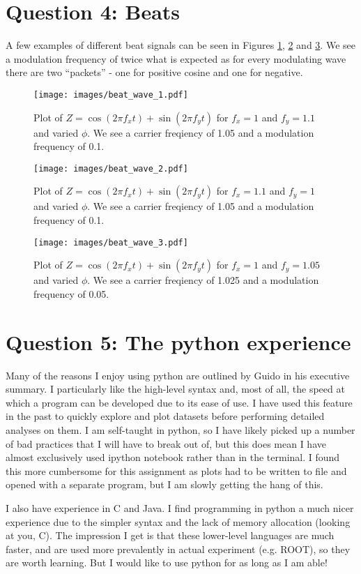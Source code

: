 \documentclass{article}
\begin{document}
\clearpage

\section*{Question 4: Beats}

A few examples of different beat signals can be seen in Figures \ref{fig:beat1}, \ref{fig:beat2} and \ref{fig:beat3}. We see a modulation frequency of twice what is expected as for every modulating wave there are two ``packets'' - one for positive cosine and one for negative.

\begin{figure}[h]
\centering
\texttt{[image: images/beat\_wave\_1.pdf]}
\caption{Plot of $Z = \cos(2\pi f_x t) + \sin(2\pi f_y t)$ for $f_x= 1$ and $f_y= 1.1$ and varied $\phi$. We see a carrier freqiency of 1.05 and a modulation frequency of 0.1.}
\label{fig:beat1}
\end{figure}

\begin{figure}[h]
\centering
\texttt{[image: images/beat\_wave\_2.pdf]}
\caption{Plot of $Z = \cos(2\pi f_x t) + \sin(2\pi f_y t)$ for $f_x= 1.1$ and $f_y= 1$ and varied $\phi$. We see a carrier freqiency of 1.05 and a modulation frequency of 0.1.}
\label{fig:beat2}
\end{figure}

\begin{figure}[h]
\centering
\texttt{[image: images/beat\_wave\_3.pdf]}
\caption{Plot of $Z = \cos(2\pi f_x t) + \sin(2\pi f_y t)$ for $f_x= 1$ and $f_y= 1.05$ and varied $\phi$. We see a carrier freqiency of 1.025 and a modulation frequency of 0.05.}
\label{fig:beat3}
\end{figure}
\clearpage

\section*{Question 5: The python experience}

Many of the reasons I enjoy using python are outlined by Guido in his executive summary. I particularly like the high-level syntax and, most of all, the speed at which a program can be developed due to its ease of use. I have used this feature in the past to quickly explore and plot datasets before performing detailed analyses on them. I am self-taught in python, so I have likely picked up a number of bad practices that I will have to break out of, but this does mean I have almost exclusively used ipython notebook rather than in the terminal. I found this more cumbersome for this assignment as plots had to be written to file and opened with a separate program, but I am slowly getting the hang of this.

I also have experience in C and Java. I find programming in python a much nicer experience due to the simpler syntax and the lack of memory allocation (looking at you, C). The impression I get is that these lower-level languages are much faster, and are used more prevalently in actual experiment (e.g. ROOT), so they are worth learning. But I would like to use python for as long as I am able! 
\end{document}
